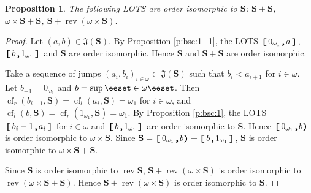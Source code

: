 \documentclass[preprint]{elsarticle}
\def\om{\omega}
\def\set#1{\bbset#1\eeset}
\def\bbset#1:#2\eeset{\{#1\,:\,#2\}}
\newtheorem{proposition}{Proposition}[section]
\theoremstyle{definition}
\theoremstyle{remark}
\def\cf{\operatorname{cf}}
\def\rev{\operatorname{rev}}
\def\ilcomma/{\boldsymbol{,}}
\def\ilsymlp{\boldsymbol{(}}
\def\ilsymrp{\boldsymbol{)}}
\def\ilsymlc{\boldsymbol{[}}
\def\ilsymrc{\boldsymbol{]}}
\def\ilfont#1{\boldsymbol{#1}}
\def\ilfontX#1{\mathrm{\text{\texttt{\textbf{\large #1}}}}}
\def\ilfontX#1{{\text{\texttt{\textbf{\large \upshape #1}}}}}
\def\ilfont#1{\raisebox{-1.2pt}{\ilfontX{#1}}}
\def\ilfontC#1{\raisebox{-0.7pt}{\ilfontX{#1}}}
\def\ilcomma/{\ilfontC{,}}
\def\ilsymlp{\ilfont{(}}
\def\ilsymrp{\ilfont{)}}
\def\ilsymlc{\ilfont{[}\,}
\def\ilsymrc{\,\ilfont{]}}
\def\ilcp[#1,#2){\ilsymlc#1\ilcomma/ #2\ilsymrp}
\def\ilpc(#1,#2]{\ilsymlp#1\ilcomma/ #2\ilsymrc}
\def\ilcc[#1,#2]{\ilsymlc#1\ilcomma/ #2\ilsymrc}
\def\jumps#1{\mathfrak{J}(#1)}
\def\sS{\mathbf{S}}
\def\mns{0_{\om_1}}
\def\mxs{1_{\om_1}}
\begin{document}
\begin{proposition}\label{p:bsc:4}
The following LOTS are order isomorphic to $\sS$: $\sS + \sS$, $\om \times \sS + \sS$, $\sS+ \rev (\om \times \sS)$.
\end{proposition}
\begin{proof}
Let $(a,b)\in \jumps \sS$. By Proposition \ref{p:bsc:1+1}, the LOTS $\ilcc[\mns,a]$, $\ilcc[b,\mxs]$ and $\sS$ are order isomorphic. Hence $\sS$ and $\sS+\sS$ are order isomorphic.

Take a sequence of jumps $(a_i,b_i)_{i\in\om}\subset \jumps \sS$ such that $b_i<a_{i+1}$ for $i\in\om$. Let $b_{-1}=\mns$ and $b=\sup \set{b_i:i\in\om}$. Then $\cf_r(b_{i-1},\sS)=\cf_l(a_i,\sS)=\om_1$ for $i\in\om$, and $\cf_l(b,\sS)=\cf_r(\mxs,\sS)=\om_1$. By Proposition \ref{p:bsc:1}, the LOTS $\ilcc[b_{i-1},a_i]$ for $i\in\om$ and $\ilcc[b,\mxs]$ are order isomorphic to $\sS$. Hence $\ilcp[\mns,b)$ is order isomorphic to $\om\times \sS$. Since $\sS=\ilcp[\mns,b)+\ilcc[b,\mxs]$, $\sS$ is order isomorphic to $\om\times \sS + \sS$.

Since $\sS$ is order isomorphic to $\rev \sS$, $\sS+ \rev(\om\times \sS)$ is order isomorphic to $\rev(\om\times \sS + \sS)$. Hence $\sS+ \rev(\om\times \sS)$ is order isomorphic to $\sS$.
\end{proof}
\end{document}
